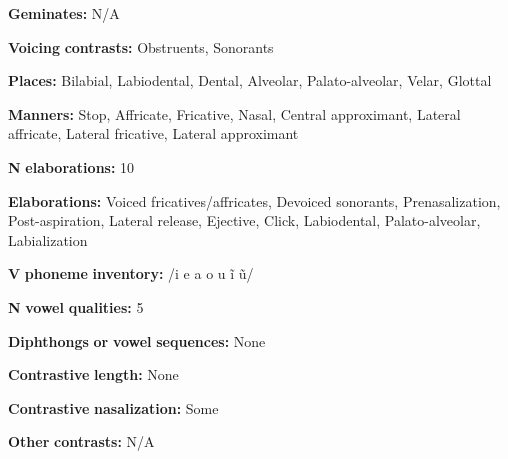 \documentclass[output=paper]{langsci/langscibook}
\begin{document}
\begin{styleBody}
\textbf{Geminates:} N/A
\end{styleBody}

\begin{styleBody}
\textbf{Voicing} \textbf{contrasts:} Obstruents, Sonorants
\end{styleBody}

\begin{styleBody}
\textbf{Places:} Bilabial, Labiodental, Dental, Alveolar, Palato-alveolar, Velar, Glottal
\end{styleBody}

\begin{styleBody}
\textbf{Manners:} Stop, Affricate, Fricative, Nasal, Central approximant, Lateral affricate, Lateral fricative, Lateral approximant
\end{styleBody}

\begin{styleBody}
\textbf{N} \textbf{elaborations:} 10
\end{styleBody}

\begin{styleBody}
\textbf{Elaborations:} Voiced fricatives/affricates, Devoiced sonorants, Prenasalization, Post-aspiration, Lateral release, Ejective, Click, Labiodental, Palato-alveolar, Labialization
\end{styleBody}

\begin{styleBody}
\textbf{V} \textbf{phoneme} \textbf{inventory:} /i e a o u ĩ ũ/
\end{styleBody}

\begin{styleBody}
\textbf{N} \textbf{vowel} \textbf{qualities:} 5
\end{styleBody}

\begin{styleBody}
\textbf{Diphthongs} \textbf{or} \textbf{vowel} \textbf{sequences:} None
\end{styleBody}

\begin{styleBody}
\textbf{Contrastive} \textbf{length:} None
\end{styleBody}

\begin{styleBody}
\textbf{Contrastive} \textbf{nasalization:} Some
\end{styleBody}

\begin{styleBody}
\textbf{Other} \textbf{contrasts:} N/A
\end{styleBody}
\end{document}
